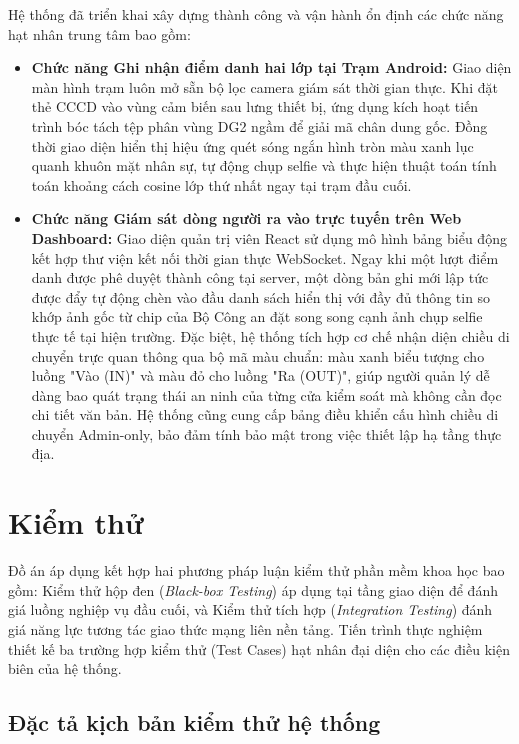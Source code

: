 \documentclass[../DoAn.tex]{subfiles}
\begin{document}
Hệ thống đã triển khai xây dựng thành công và vận hành ổn định các chức năng hạt nhân trung tâm bao gồm:
\begin{itemize}
    \item \textbf{Chức năng Ghi nhận điểm danh hai lớp tại Trạm Android:} Giao diện màn hình trạm luôn mở sẵn bộ lọc camera giám sát thời gian thực. Khi đặt thẻ CCCD vào vùng cảm biến sau lưng thiết bị, ứng dụng kích hoạt tiến trình bóc tách tệp phân vùng DG2 ngầm để giải mã chân dung gốc. Đồng thời giao diện hiển thị hiệu ứng quét sóng ngắn hình tròn màu xanh lục quanh khuôn mặt nhân sự, tự động chụp selfie và thực hiện thuật toán tính toán khoảng cách cosine lớp thứ nhất ngay tại trạm đầu cuối.
    \item \textbf{Chức năng Giám sát dòng người ra vào trực tuyến trên Web Dashboard:} Giao diện quản trị viên React sử dụng mô hình bảng biểu động kết hợp thư viện kết nối thời gian thực WebSocket. Ngay khi một lượt điểm danh được phê duyệt thành công tại server, một dòng bản ghi mới lập tức được đẩy tự động chèn vào đầu danh sách hiển thị với đầy đủ thông tin so khớp ảnh gốc từ chip của Bộ Công an đặt song song cạnh ảnh chụp selfie thực tế tại hiện trường. Đặc biệt, hệ thống tích hợp cơ chế nhận diện chiều di chuyển trực quan thông qua bộ mã màu chuẩn: màu xanh biểu tượng cho luồng "Vào (IN)" và màu đỏ cho luồng "Ra (OUT)", giúp người quản lý dễ dàng bao quát trạng thái an ninh của từng cửa kiểm soát mà không cần đọc chi tiết văn bản. Hệ thống cũng cung cấp bảng điều khiển cấu hình chiều di chuyển Admin-only, bảo đảm tính bảo mật trong việc thiết lập hạ tầng thực địa.
\end{itemize}

\section{Kiểm thử}
\label{section:4.4}

Đồ án áp dụng kết hợp hai phương pháp luận kiểm thử phần mềm khoa học bao gồm: Kiểm thử hộp đen (\textit{Black-box Testing}) áp dụng tại tầng giao diện để đánh giá luồng nghiệp vụ đầu cuối, và Kiểm thử tích hợp (\textit{Integration Testing}) đánh giá năng lực tương tác giao thức mạng liên nền tảng. Tiến trình thực nghiệm thiết kế ba trường hợp kiểm thử (Test Cases) hạt nhân đại diện cho các điều kiện biên của hệ thống.

\subsection{Đặc tả kịch bản kiểm thử hệ thống}
\end{document}
